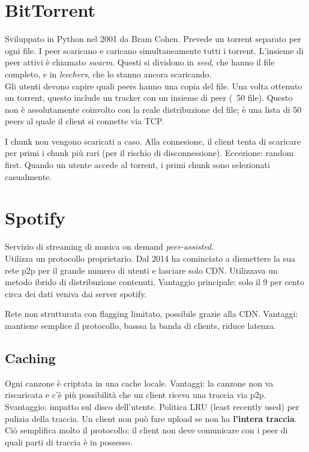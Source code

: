 \section{BitTorrent}
Sviluppato in Python nel 2001 da Bram Cohen.
Prevede un torrent separato per ogni file. I peer scaricano e caricano simultaneamente tutti i torrent. L'insieme di peer attivi è chiamato \textit{swarm}. Questi si dividono in \textit{seed}, che hanno il file completo, e in \textit{leechers}, che lo stanno ancora scaricando. \\
Gli utenti devono capire quali peers hanno una copia del file.
Una volta ottenuto un torrent, questo include un tracker con un insieme di peer (~50 file). Questo non è assolutamente coinvolto con la reale distribuzione del file; è una lista di 50 peers al quale il client si connette via TCP.

I chunk non vengono scaricati a caso. Alla connesione, il client tenta di scaricare per primi i chunk più rari (per il rischio di disconnessione).
Eccezione: random first. Quando un utente accede al torrent, i primi chunk sono selezionati casualmente.




\section{Spotify}
Servizio di streaming di musica on demand \textit{peer-assisted}.\\
Utilizza un protocollo proprietario. Dal 2014 ha cominciato a dismettere la sua rete p2p per il grande numero di utenti e lasciare solo CDN.
Utilizzava un metodo ibrido di distribuzione contenuti. Vantaggio principale: solo il 9 per cento circa dei dati veniva dai server spotify.

Rete non strutturata con flagging limitato, possibile grazie alla CDN. Vantaggi: mantiene semplice il protocollo, basssa la banda di clients, riduce latenza.

\subsection{Caching}
Ogni canzone è criptata in una cache locale. Vantaggi: la canzone non va riscaricata e c'è più possibilità che un client riceva una traccia via p2p. Svantaggio: impatto sul disco dell'utente. Politica LRU (least recently used) per pulizia della traccia.
Un client non può fare upload se non ha \textbf{l'intera traccia}. Ciò semplifica molto il protocollo: il client non deve comunicare con i peer di quali parti di traccia è in possesso.

